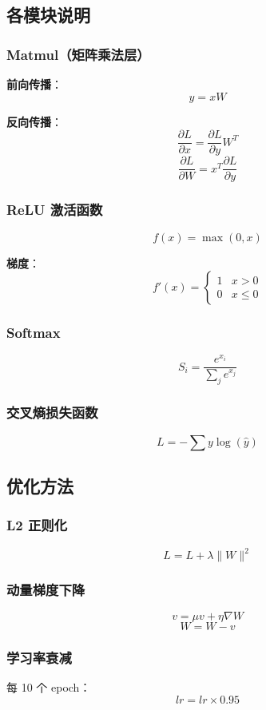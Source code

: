 \subsection{各模块说明}

\subsubsection{Matmul（矩阵乘法层）}

\textbf{前向传播}：
\[
y = xW
\]

\textbf{反向传播}：
\[
\frac{\partial L}{\partial x} = \frac{\partial L}{\partial y} W^T
\]
\[
\frac{\partial L}{\partial W} = x^T \frac{\partial L}{\partial y}
\]

\subsubsection{ReLU 激活函数}

\[
f(x) = \max(0, x)
\]

\textbf{梯度}：
\[
f'(x) = 
\begin{cases} 
1 & x > 0 \\
0 & x \leq 0
\end{cases}
\]

\subsubsection{Softmax}

\[
S_i = \frac{e^{x_i}}{\sum_j e^{x_j}}
\]

\subsubsection{交叉熵损失函数}

\[
L = -\sum y \log(\hat{y})
\]

\subsection{优化方法}

\subsubsection{L2 正则化}

\[
L = L + \lambda \|W\|^2
\]

\subsubsection{动量梯度下降}

\[
v = \mu v + \eta \nabla W
\]
\[
W = W - v
\]

\subsubsection{学习率衰减}

每 10 个 epoch：
\[
lr = lr \times 0.95
\]
